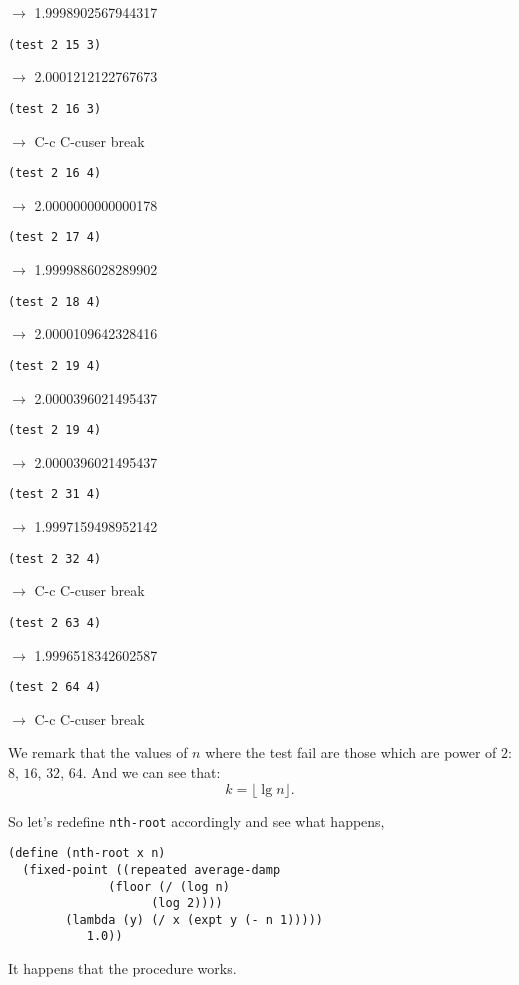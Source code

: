 \documentclass[a4paper,12pt]{article}
\begin{document}
$\rightarrow$ 1.9998902567944317
\begin{lstlisting}
(test 2 15 3)
\end{lstlisting}
$\rightarrow$ 2.0001212122767673
\begin{lstlisting}
(test 2 16 3)
\end{lstlisting}
 $\rightarrow$ C-c C-cuser break
\begin{lstlisting}
(test 2 16 4)
\end{lstlisting}
$\rightarrow$ 2.0000000000000178
\begin{lstlisting}
(test 2 17 4)
\end{lstlisting}
$\rightarrow$ 1.9999886028289902
\begin{lstlisting}
(test 2 18 4)
\end{lstlisting}
$\rightarrow$ 2.0000109642328416
\begin{lstlisting}
(test 2 19 4)
\end{lstlisting}
$\rightarrow$ 2.0000396021495437
\begin{lstlisting}
(test 2 19 4)
\end{lstlisting}
$\rightarrow$ 2.0000396021495437
\begin{lstlisting}
(test 2 31 4)
\end{lstlisting}
$\rightarrow$ 1.9997159498952142
\begin{lstlisting}
(test 2 32 4)
\end{lstlisting}
$\rightarrow$   C-c C-cuser break
\begin{lstlisting}
(test 2 63 4)
\end{lstlisting}
$\rightarrow$ 1.9996518342602587
\begin{lstlisting}
(test 2 64 4)
\end{lstlisting}
$\rightarrow$   C-c C-cuser break

We remark that the values of $n$ where the test fail are those which
are power of $2$: $8$, $16$, $32$, $64$.  And we can see that:
\[ k = \lfloor \lg n\rfloor.\]

So let's redefine \lstinline!nth-root! accordingly and see what happens,
\begin{lstlisting}
(define (nth-root x n)
  (fixed-point ((repeated average-damp
			  (floor (/ (log n)
				    (log 2))))
		(lambda (y) (/ x (expt y (- n 1)))))
	       1.0))
\end{lstlisting}
It happens that the procedure works.
\end{document}
